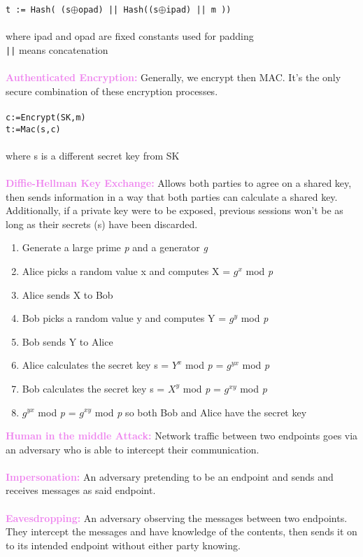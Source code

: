 \documentclass[a4paper,10pt]{article}
\begin{document}
\indent \texttt{t := Hash( (s$\oplus$opad) || Hash((s$\oplus$ipad) || m ))} \\\\
\indent where ipad and opad are fixed constants used for padding \\
\indent \texttt{||} means concatenation \\\\
\textcolor{Violet}{\textbf{Authenticated Encryption:}} Generally, we encrypt then MAC. It's the only secure combination of these encryption processes. \\\\ 
\indent \texttt{c:=Encrypt(SK,m)}\\
\indent \texttt{t:=Mac(s,c)} \\\\
\indent where s is a different secret key from SK\\\\ 
\textcolor{Violet}{\textbf{Diffie-Hellman Key Exchange:}} Allows both parties to agree on a shared key, then sends information in a way that both parties can calculate a shared key. Additionally, if a private key were to be exposed, previous sessions won't be as long as their secrets (s) have been discarded. 
\begin{enumerate}
\item Generate a large prime \textit{p} and a generator \textit{g}
\item Alice picks a random value x and computes X = $g^x$ mod \textit{p}
\item Alice sends X to Bob
\item Bob picks a random value y and computes Y = $g^y$ mod \textit{p}
\item Bob sends Y to Alice 
\item Alice calculates the secret key s = $Y^x$ mod \textit{p} = $g^{yx}$ mod \textit{p}
\item Bob calculates the secret key s = $X^y$ mod \textit{p} = $g^{xy}$ mod \textit{p}
\item $g^{yx}$ mod \textit{p} = $g^{xy}$ mod \textit{p} so both Bob and Alice have the secret key
\end{enumerate}
\textcolor{Violet}{\textbf{Human in the middle Attack:}} Network traffic between two endpoints goes via an adversary who is able to intercept their communication. \\\\
\textcolor{Violet}{\textbf{Impersonation:}} An adversary pretending to be an endpoint and sends and receives messages as said endpoint.\\\\
\textcolor{Violet}{\textbf{Eavesdropping:}} An adversary observing the messages between two endpoints. They intercept the messages and have knowledge of the contents, then sends it on to its intended endpoint without either party knowing. \\\\ 
\end{document}
